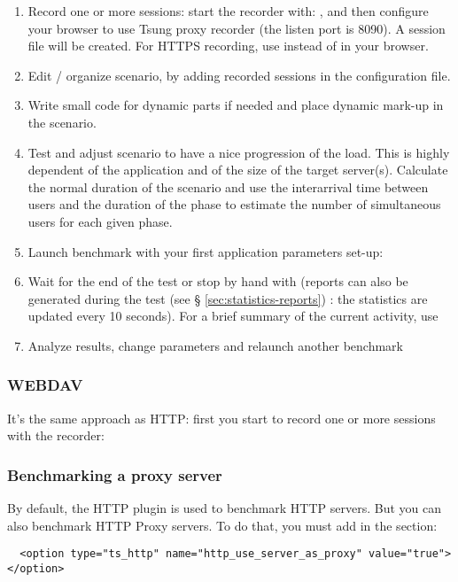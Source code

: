 \documentclass{IDXDOC-en}
\begin{document}
\begin{enumerate}
\item Record one or more sessions: start the recorder with: , and then configure your browser to use Tsung
  proxy recorder (the listen port is 8090). A session file will be
  created. For HTTPS recording, use  instead of
     in your browser.
\item Edit / organize scenario, by adding recorded sessions in the
  configuration file.
\item Write small code for dynamic parts if needed and place dynamic mark-up
in the scenario.
\item Test and adjust scenario to have a nice progression of the load. This
is highly dependent of the application and of the size of the target
server(s). Calculate the normal duration of the scenario and use the
interarrival time between users and the duration of the phase to estimate
the number of simultaneous users for each given phase.
\item Launch benchmark with your first application parameters set-up:
\item Wait for the end of the test or stop by hand with
   (reports can also be generated during the
  test (see § \ref{sec:statistics-reports}) : the statistics are
  updated every 10 seconds). For a brief summary of the current
  activity, use 
\item Analyze results, change parameters and relaunch another benchmark
\end{enumerate}

\subsubsection{WEBDAV }

It's the same approach as HTTP: first you start to record one or more
sessions with the recorder:

\subsubsection{Benchmarking a proxy server}

By default, the HTTP plugin is used to benchmark HTTP servers. But you
can also benchmark HTTP Proxy servers. To do that, you must add in the
 section:

\begin{Verbatim}
  <option type="ts_http" name="http_use_server_as_proxy" value="true"></option>
\end{Verbatim}
\end{document}

